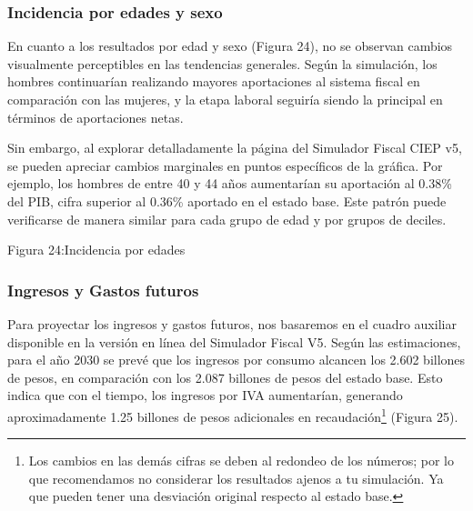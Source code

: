 
\hypertarget{incidencia-por-edades-y-sexo}{%
\subsubsection{Incidencia por edades y
sexo}\label{incidencia-por-edades-y-sexo}}

En cuanto a los resultados por edad y sexo (Figura 24), no se observan
cambios visualmente perceptibles en las tendencias generales. Según la
simulación, los hombres continuarían realizando mayores aportaciones al
sistema fiscal en comparación con las mujeres, y la etapa laboral
seguiría siendo la principal en términos de aportaciones netas.

Sin embargo, al explorar detalladamente la página del Simulador Fiscal
CIEP v5, se pueden apreciar cambios marginales en puntos específicos de
la gráfica. Por ejemplo, los hombres de entre 40 y 44 años aumentarían
su aportación al 0.38\% del PIB, cifra superior al 0.36\% aportado en el
estado base. Este patrón puede verificarse de manera similar para cada
grupo de edad y por grupos de deciles.

Figura 24:Incidencia por edades


\hypertarget{ingresos-y-gastos-futuros}{%
\subsubsection{Ingresos y Gastos
futuros}\label{ingresos-y-gastos-futuros}}

Para proyectar los ingresos y gastos futuros, nos basaremos en el cuadro
auxiliar disponible en la versión en línea del Simulador Fiscal V5.
Según las estimaciones, para el año 2030 se prevé que los ingresos por
consumo alcancen los 2.602 billones de pesos, en comparación con los
2.087 billones de pesos del estado base. Esto indica que con el tiempo,
los ingresos por IVA aumentarían, generando aproximadamente 1.25
billones de pesos adicionales en recaudación\footnote{Los cambios en las
  demás cifras se deben al redondeo de los números; por lo que
  recomendamos no considerar los resultados ajenos a tu simulación. Ya
  que pueden tener una desviación original respecto al estado base.}
(Figura 25).

